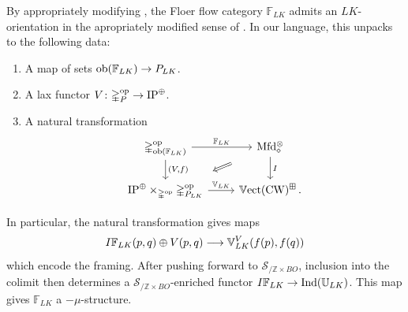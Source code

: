 \documentclass[10pt]{amsart}
\numberwithin{equation}{section}
\theoremstyle{definition}
\DeclareMathOperator{\ob}{ob}
\DeclareMathOperator{\op}{op}
\DeclareMathOperator{\Ind}{Ind}
\DeclareMathOperator{\bVect}{\mathbb{V}ect}
\DeclareMathOperator{\CW}{CW}
\newcommand{\Mfd}{\mathrm{Mfd}\vphantom{d}}
\newcommand{\bF}{\mathbb{F}}
\newcommand{\bZ}{\mathbb{Z}}
\newcommand{\bU}{\mathbb{U}}
\newcommand{\bV}{\mathbb{V}}
\newcommand{\Simp}{\mathbb{\Delta}}
\newcommand{\cS}{\mathcal{S}}
\newcommand{\IP}{\mathrm{IP}}
\renewcommand{\to}{\mathchoice{\longrightarrow}{\rightarrow}{}{}}
\begin{document}
	By appropriately modifying \cite[Corollary 6.15]{porcelli2024spectral}, the Floer flow category $\bF_{LK}$ admits an $LK$-orientation in the apropriately modified sense of \cite[Definition 5.1]{porcelli2024spectral}.
  In our language, this unpacks to the following data:
	\begin{enumerate}
		\item  A map of sets $\ob(\bF_{LK}) \to P_{LK}$.
		\item  A lax functor $V\colon \Simp^{\op}_P \to \IP^{\oplus}$.
		\item  A natural transformation
		\begin{equation*}
			\begin{tikzcd}
				\Simp^{\op}_{\ob(\bF_{LK})} \arrow[r, "\bF_{LK}"] \arrow[d,"{(V,f)}"]      &   \Mfd_{\diamond}^{\otimes}  \arrow[d, "I"] \arrow[dl,Rightarrow,shorten=2em] \\
				\IP^{\oplus}\times_{\Simp^{\op}} \Simp^{\op}_{P_{LK}}  \arrow[r, "\bV_{LK}"]               &   \bVect(\CW)^{\boxplus}\,.
			\end{tikzcd}
		\end{equation*}

	\end{enumerate}
	In particular, the natural transformation gives maps
	\begin{align*}
		I\bF_{LK}(p,q) \oplus V(p,q) \to \bV^{V}_{LK}(f(p),f(q))
	\end{align*}
	which encode the framing.
  After pushing forward to $\cS_{/ \bZ\times BO}$, inclusion into the colimit then determines a $\cS_{/ \bZ\times BO}$-enriched functor $I\bF_{LK} \to \Ind(\bU_{LK})$.
  This map gives $\bF_{LK}$ a $-\mu$-structure.

\printbibliography
\end{document}
